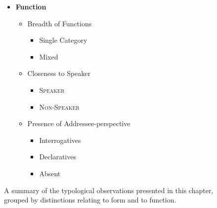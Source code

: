 \begin{figure}
\begin{multicols}{2}
                \columnbreak
        \begin{itemize}        
                \item[] \textbf{Function}
                \begin{itemize}
                        \item[] Breadth of Functions
                        \begin{itemize}
                                \item Single Category
                                \item Mixed 
                        \end{itemize}
                        \item[] Closeness to Speaker
                        \begin{itemize}
                                \item \textsc{Speaker}
                                \item \textsc{Non-Speaker}
                        \end{itemize}
                        \item[] Presence of Addressee-perspective
                        \begin{itemize}
                                \item Interrogatives
                                \item Declaratives
                                \item Absent
                        \end{itemize}
                \end{itemize}
        \end{itemize} 
\end{multicols}
        \caption{A summary of the typological observations presented in this chapter, grouped by distinctions relating to form and to function.}\label{f:Description:SummaryOverview}
\end{figure}

